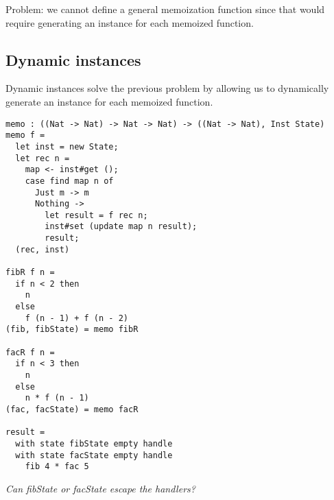 \documentclass[12pt]{article}
\begin{document}
Problem: we cannot define a general memoization function since that would require generating an instance for each memoized function.

\newpage
\subsection{Dynamic instances}

Dynamic instances solve the previous problem by allowing us to dynamically generate an instance for each memoized function.
\begin{verbatim}
memo : ((Nat -> Nat) -> Nat -> Nat) -> ((Nat -> Nat), Inst State)
memo f =
  let inst = new State;
  let rec n =
    map <- inst#get ();
    case find map n of
      Just m -> m
      Nothing ->
        let result = f rec n;
        inst#set (update map n result);
        result;
  (rec, inst)

fibR f n =
  if n < 2 then
    n
  else
    f (n - 1) + f (n - 2)
(fib, fibState) = memo fibR

facR f n =
  if n < 3 then
    n
  else
    n * f (n - 1)
(fac, facState) = memo facR

result =
  with state fibState empty handle
  with state facState empty handle
    fib 4 * fac 5
\end{verbatim}

\it{Can fibState or facState escape the handlers?}
\end{document}
